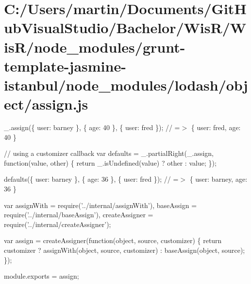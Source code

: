 \hypertarget{_c_1_2_users_2martin_2_documents_2_git_hub_visual_studio_2_bachelor_2_wis_r_2_wis_r_2node_module36fe1d61e52ad0448f9b525f6a9946d1}{}\section{C\+:/\+Users/martin/\+Documents/\+Git\+Hub\+Visual\+Studio/\+Bachelor/\+Wis\+R/\+Wis\+R/node\+\_\+modules/grunt-\/template-\/jasmine-\/istanbul/node\+\_\+modules/lodash/object/assign.\+js}
\+\_\+.\+assign(\{ \textquotesingle{}user\textquotesingle{}\+: \textquotesingle{}barney\textquotesingle{} \}, \{ \textquotesingle{}age\textquotesingle{}\+: 40 \}, \{ \textquotesingle{}user\textquotesingle{}\+: \textquotesingle{}fred\textquotesingle{} \}); // =$>$ \{ \textquotesingle{}user\textquotesingle{}\+: \textquotesingle{}fred\textquotesingle{}, \textquotesingle{}age\textquotesingle{}\+: 40 \}

// using a customizer callback var defaults = \+\_\+.\+partial\+Right(\+\_\+.\+assign, function(value, other) \{ return \+\_\+.\+is\+Undefined(value) ? other \+: value; \});

defaults(\{ \textquotesingle{}user\textquotesingle{}\+: \textquotesingle{}barney\textquotesingle{} \}, \{ \textquotesingle{}age\textquotesingle{}\+: 36 \}, \{ \textquotesingle{}user\textquotesingle{}\+: \textquotesingle{}fred\textquotesingle{} \}); // =$>$ \{ \textquotesingle{}user\textquotesingle{}\+: \textquotesingle{}barney\textquotesingle{}, \textquotesingle{}age\textquotesingle{}\+: 36 \}


\begin{DoxyCodeInclude}
var assignWith = require(\textcolor{stringliteral}{'../internal/assignWith'}),
    baseAssign = require(\textcolor{stringliteral}{'../internal/baseAssign'}),
    createAssigner = require(\textcolor{stringliteral}{'../internal/createAssigner'});

var assign = createAssigner(\textcolor{keyword}{function}(\textcolor{keywordtype}{object}, source, customizer) \{
  \textcolor{keywordflow}{return} customizer
    ? assignWith(\textcolor{keywordtype}{object}, source, customizer)
    : baseAssign(object, source);
\});

module.exports = assign;
\end{DoxyCodeInclude}
 